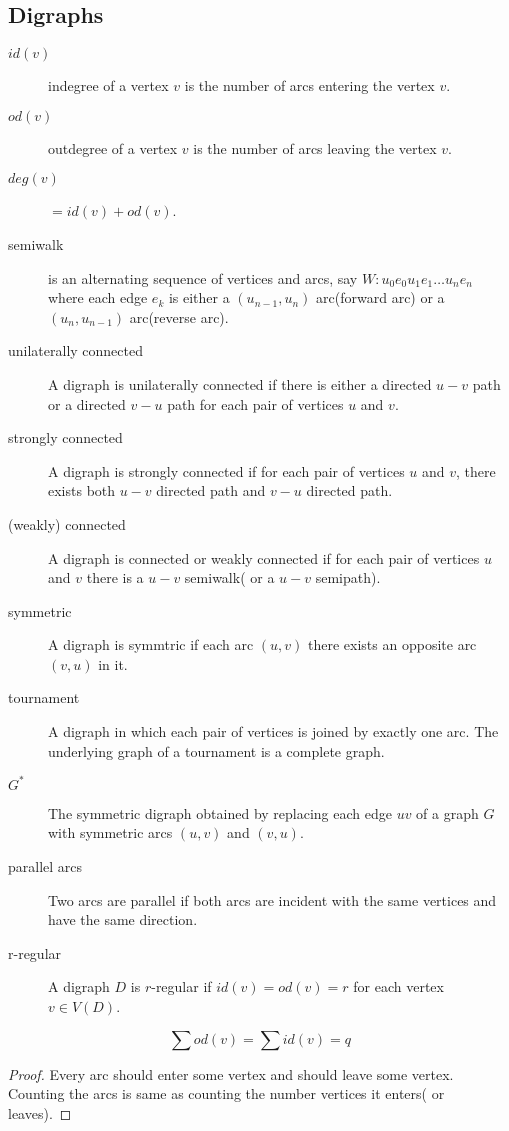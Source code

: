 \subsection{Digraphs}
\begin{description}
	\item[$id(v)$] indegree of a vertex $v$ is the number of arcs entering the vertex $v$.
	\item[$od(v)$] outdegree of a vertex $v$ is the number of arcs leaving the vertex $v$.
	\item[$deg(v)$] $=id(v) + od(v)$.
	\item[semiwalk] is an alternating sequence of vertices and arcs, say $W : u_0 e_0 u_1 e_1 \dots u_n e_n$ where each edge $e_k$ is either a $(u_{n-1},u_n)$ arc(forward arc) or a $(u_n,u_{n-1})$ arc(reverse arc).
	\item[unilaterally connected] A digraph is unilaterally connected if there is either a directed $u-v$ path or a directed $v-u$ path for each pair of vertices $u$ and $v$.
	\item[strongly connected] A digraph is strongly connected if for each pair of vertices $u$ and $v$, there exists both $u-v$ directed path and $v-u$ directed path.
	\item[(weakly) connected] A digraph is connected or weakly connected if for each pair of vertices $u$ and $v$ there is a $u-v$ semiwalk( or a $u-v$ semipath).
	\item[symmetric] A digraph is symmtric if each arc $(u,v)$ there exists an opposite arc $(v,u)$ in it.
	\item[tournament] A digraph in which each pair of vertices is joined by exactly one arc. The underlying graph of a tournament is a complete graph.
	\item[$G^\ast$] The symmetric digraph obtained by replacing each edge $uv$ of a graph $G$ with symmetric arcs $(u,v)$ and $(v,u)$.
	\item[parallel arcs] Two arcs are parallel if both arcs are incident with the same vertices and have the same direction.
	\item[r-regular] A digraph $D$ is $r$-regular if $id(v) = od(v) = r$ for each vertex $v \in V(D)$.
\end{description}
\begin{theorem}
	$$\sum od(v) = \sum id(v) = q $$
\end{theorem}
\begin{proof}
	Every arc should enter some vertex and should leave some vertex. Counting the arcs is same as counting the number vertices it enters( or leaves).
\end{proof}
